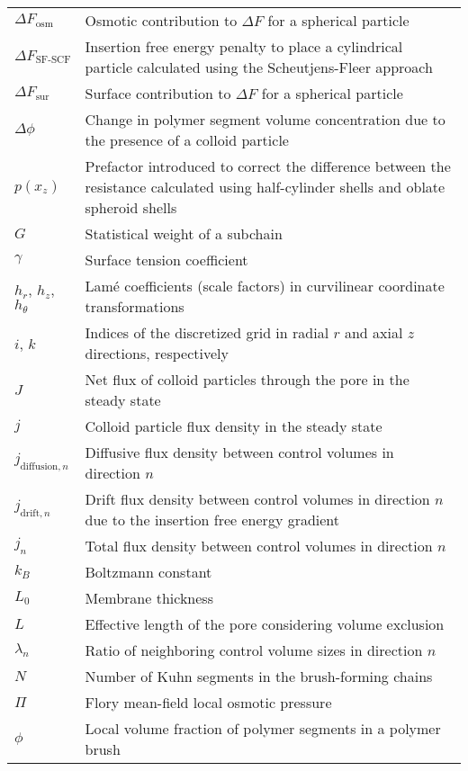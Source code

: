 \documentclass[10pt, a4paper]{article}
\begin{document}
\begin{tabularx}{\linewidth}{l X}
    $\Delta F_{\text{osm}}$ & Osmotic contribution to $\Delta F$ for a spherical particle\\
    $\Delta F_{\text{SF-SCF}}$ & Insertion free energy penalty to place a cylindrical particle calculated using the Scheutjens-Fleer approach \\
    $\Delta F_{\text{sur}}$ & Surface contribution to $\Delta F$ for a spherical particle\\
    $\Delta \phi$ & Change in polymer segment volume concentration due to the presence of a colloid particle \\
    $p(x_z)$ & Prefactor introduced to correct the difference between the resistance calculated using half-cylinder shells and oblate spheroid shells \\
    $G$ & Statistical weight of a subchain \\
    $\gamma$ & Surface tension coefficient \\
    $h_{r}$, $h_{z}$, $h_{\theta}$ & Lam\'e coefficients (scale factors) in curvilinear coordinate transformations \\
    $i$, $k$ & Indices of the discretized grid in radial $r$ and axial $z$ directions, respectively \\
    $J$ & Net flux of colloid particles through the pore in the steady state \\
    $j$ & Colloid particle flux density in the steady state \\
    $j_{\text{diffusion}, n}$ & Diffusive flux density between control volumes in direction $n$ \\
    $j_{\text{drift}, n}$ & Drift flux density between control volumes in direction $n$ due to the insertion free energy gradient \\
    $j_{n}$ & Total flux density between control volumes in direction $n$ \\
    $k_B$ & Boltzmann constant \\
    $L_{0}$ & Membrane thickness \\
    $L$ & Effective length of the pore considering volume exclusion \\
    $\lambda_{n}$ & Ratio of neighboring control volume sizes in direction $n$ \\
    $N$ & Number of Kuhn segments in the brush-forming chains \\
    $\Pi$ & Flory mean-field local osmotic pressure \\
    $\phi$ & Local volume fraction of polymer segments in a polymer brush \\

\end{tabularx}
\end{document}
